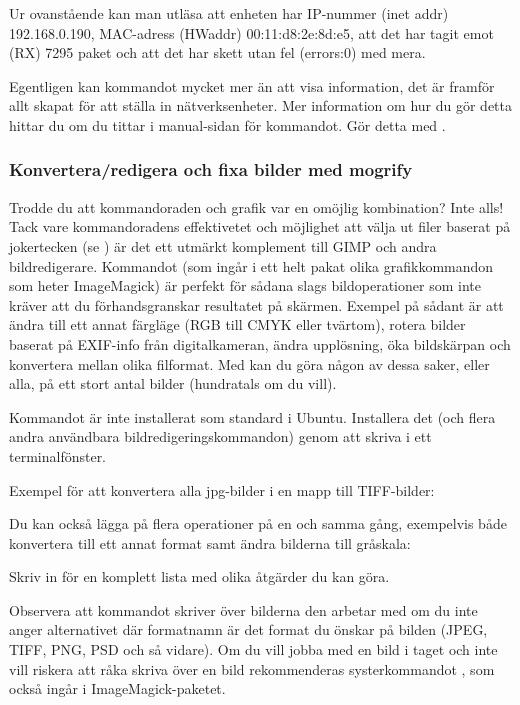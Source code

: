 \documentclass[a4paper,final]{memoir} %
\begin{document}
Ur ovanstående kan man utläsa att enheten har IP-nummer (inet addr) 192.168.0.190, MAC-adress (HWaddr) 00:11:d8:2e:8d:e5, att det har tagit emot (RX) 7295 paket och att det har skett utan fel (errors:0) med mera.

Egentligen kan kommandot mycket mer än att visa information, det är framför allt skapat för att ställa in nätverksenheter. Mer information om hur du gör detta hittar du om du tittar i manual-sidan för kommandot. Gör detta med .

\subsubsection{Konvertera/redigera och fixa bilder med mogrify} 

Trodde du att kommandoraden och grafik var en omöjlig kombination? Inte alls! Tack vare kommandoradens effektivetet och möjlighet att välja ut filer baserat på jokertecken (se ) är det ett utmärkt komplement till GIMP och andra bildredigerare. Kommandot  (som ingår i ett helt pakat olika grafikkommandon som heter ImageMagick) är perfekt för sådana slags bildoperationer som inte kräver att du förhandsgranskar resultatet på skärmen. Exempel på sådant är att ändra till ett annat färgläge (RGB till CMYK eller tvärtom), rotera bilder baserat på EXIF-info från digitalkameran, ändra upplösning, öka bildskärpan och konvertera mellan olika filformat. Med  kan du göra någon av dessa saker, eller alla, på ett stort antal bilder (hundratals om du vill).

Kommandot  är inte installerat som standard i Ubuntu. Installera det (och flera andra användbara bildredigeringskommandon) genom att skriva  i ett terminalfönster. 

Exempel för att konvertera alla jpg-bilder i en mapp till TIFF-bilder:


Du kan också lägga på flera operationer på en och samma gång, exempelvis både konvertera till ett annat format samt ändra bilderna till gråskala:


Skriv in  för en komplett lista med olika åtgärder du kan göra.

Observera att kommandot skriver över bilderna den arbetar med om du inte anger alternativet  där formatnamn är det format du önskar på bilden (JPEG, TIFF, PNG, PSD och så vidare). Om du vill jobba med en bild i taget och inte vill riskera att råka skriva över en bild rekommenderas systerkommandot , som också ingår i ImageMagick-paketet.
\end{document}
